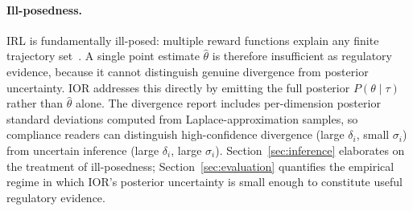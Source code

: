 \paragraph{Ill-posedness.}
IRL is fundamentally ill-posed: multiple reward functions explain any finite
trajectory set~\citep{partialIdentifiability2024}. A single point estimate
$\hat{\theta}$ is therefore insufficient as regulatory evidence, because it cannot
distinguish genuine divergence from posterior uncertainty. IOR addresses this
directly by emitting the full posterior $P(\theta \mid \tau)$ rather than
$\hat{\theta}$ alone. The divergence report includes per-dimension posterior
standard deviations computed from Laplace-approximation samples, so compliance
readers can distinguish high-confidence divergence (large $\delta_i$, small
$\sigma_i$) from uncertain inference (large $\delta_i$, large $\sigma_i$).
Section~\ref{sec:inference} elaborates on the treatment of ill-posedness;
Section~\ref{sec:evaluation} quantifies the empirical regime in which IOR's
posterior uncertainty is small enough to constitute useful regulatory evidence.
